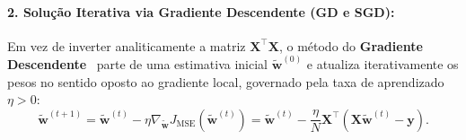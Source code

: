 \documentclass[runningheads]{llncs}
\begin{document}
\paragraph{2. Solu\c{c}\~{a}o Iterativa via Gradiente Descendente (GD e SGD):}
Em vez de inverter analiticamente a matriz $\mathbf{X}^\top \mathbf{X}$, o m\'{e}todo do \textbf{Gradiente Descendente}~\cite{robbins1951stochastic,lecun1998efficient} parte de uma estimativa inicial $\tilde{\mathbf{w}}^{(0)}$ e atualiza iterativamente os pesos no sentido oposto ao gradiente local, governado pela taxa de aprendizado $\eta > 0$:
\begin{equation}
    \tilde{\mathbf{w}}^{(t+1)} = \tilde{\mathbf{w}}^{(t)} - \eta \nabla_{\tilde{\mathbf{w}}} J_{\text{MSE}}(\tilde{\mathbf{w}}^{(t)}) = \tilde{\mathbf{w}}^{(t)} - \frac{\eta}{N} \mathbf{X}^\top (\mathbf{X}\tilde{\mathbf{w}}^{(t)} - \mathbf{y}).
    \label{eq:gd_ols}
\end{equation}
\end{document}
